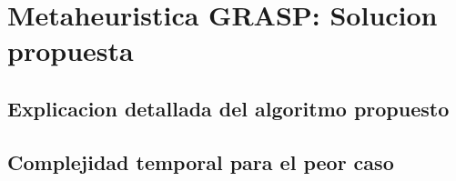 \section{Metaheuristica GRASP: Solucion propuesta}
\subsection{Explicacion detallada del algoritmo propuesto}
\subsection{Complejidad temporal para el peor caso}

